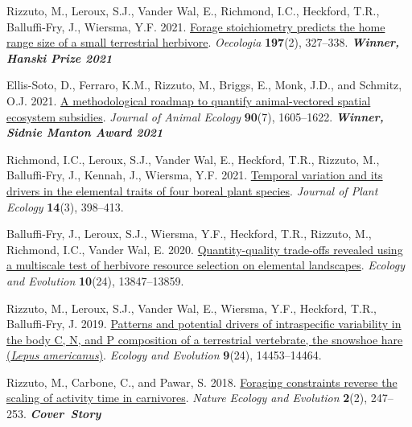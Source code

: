 \begin{etaremune}
  \item \textcolor{awesome}{Rizzuto, M.}, Leroux, S.J., Vander Wal, E., Richmond, I.C., Heckford, T.R., Balluffi-Fry, J., Wiersma, Y.F. 2021. \href{https://rdcu.be/cSX31}{Forage stoichiometry predicts the home range size of a small terrestrial herbivore}. \emph{Oecologia} \textbf{197}(2), 327--338. \hfill\textbf{\textit{Winner, Hanski Prize 2021}}
  \item Ellis-Soto, D.\textsuperscript{\textdagger}, Ferraro, K.M.\textsuperscript{\textdagger}, \textcolor{awesome}{Rizzuto, M.}, Briggs, E., Monk, J.D., and Schmitz, O.J. 2021. \href{https://doi.org/10.1111/1365-2656.13538}{A methodological roadmap to quantify animal-vectored spatial ecosystem subsidies}. \emph{Journal of Animal Ecology} \textbf{90}(7), 1605--1622. \hfill\textbf{\textit{Winner, Sidnie Manton Award 2021}}
  \item Richmond, I.C., Leroux, S.J., Vander Wal, E., Heckford, T.R., \textcolor{awesome}{Rizzuto, M.}, Balluffi-Fry, J., Kennah, J., Wiersma, Y.F. 2021. \href{https://doi.org/10.1093/jpe/rtaa103}{Temporal variation and its drivers in the elemental traits of four boreal plant species}. \emph{Journal of Plant Ecology} \textbf{14}(3), 398--413.
  \item Balluffi-Fry, J., Leroux, S.J., Wiersma, Y.F., Heckford, T.R., \textcolor{awesome}{Rizzuto, M.}, Richmond, I.C., Vander Wal, E. 2020. \href{https://doi.org/10.1002/ece3.6975}{Quantity-quality trade-offs revealed using a multiscale test of herbivore resource selection on elemental landscapes}. \emph{Ecology and Evolution} \textbf{10}(24), 13847--13859.
  \item \textcolor{awesome}{Rizzuto, M.}, Leroux, S.J., Vander Wal, E., Wiersma, Y.F., Heckford, T.R., Balluffi-Fry, J. 2019. \href{https://doi.org/10.1002/ece3.5880}{Patterns and potential drivers of intraspecific variability in the body C, N, and P composition of a terrestrial vertebrate, the snowshoe hare (\textit{Lepus americanus})}. \textit{Ecology and Evolution} \textbf{9}(24), 14453--14464.
  \item \textcolor{awesome}{Rizzuto, M.}, Carbone, C., and Pawar, S. 2018. \href{https://doi.org/10.1038/s41559-017-0386-1}{Foraging constraints reverse the scaling of activity time in carnivores}. \emph{Nature Ecology and Evolution} \textbf{2}(2), 247--253. \null\hfill\textbf{\textit{Cover~Story}}
\end{etaremune}


